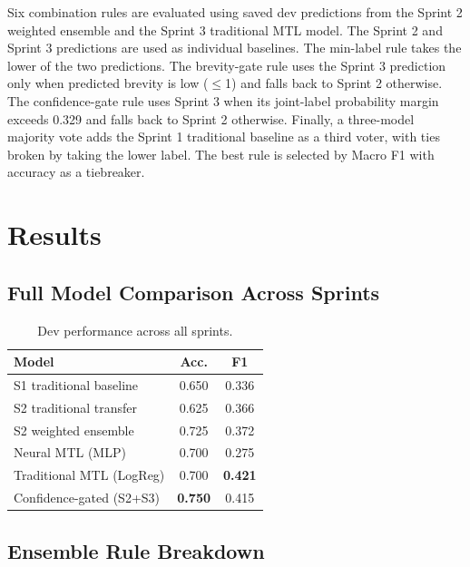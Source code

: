 \documentclass[11pt,twocolumn]{article}
\begin{document}
Six combination rules are evaluated using saved dev predictions from the Sprint
2 weighted ensemble and the Sprint 3 traditional MTL model. The Sprint 2 and
Sprint 3 predictions are used as individual baselines. The min-label rule takes
the lower of the two predictions. The brevity-gate rule uses the Sprint 3
prediction only when predicted brevity is low ($\leq$1) and falls back to
Sprint 2 otherwise. The confidence-gate rule uses Sprint 3 when its joint-label
probability margin exceeds 0.329 and falls back to Sprint 2 otherwise. Finally,
a three-model majority vote adds the Sprint 1 traditional baseline as a third
voter, with ties broken by taking the lower label. The best rule is selected by
Macro F1 with accuracy as a tiebreaker.

\section{Results}

\subsection{Full Model Comparison Across Sprints}

\begin{table}[ht]
\centering
\small
\begin{tabular}{lcc}
\toprule
\textbf{Model} & \textbf{Acc.} & \textbf{F1} \\
\midrule
S1 traditional baseline   & 0.650 & 0.336 \\
S2 traditional transfer   & 0.625 & 0.366 \\
S2 weighted ensemble      & 0.725 & 0.372 \\
Neural MTL (MLP)          & 0.700 & 0.275 \\
Traditional MTL (LogReg)  & 0.700 & \textbf{0.421} \\
Confidence-gated (S2+S3)  & \textbf{0.750} & 0.415 \\
\bottomrule
\end{tabular}
\caption{Dev performance across all sprints.}
\end{table}

\subsection{Ensemble Rule Breakdown}
\end{document}
